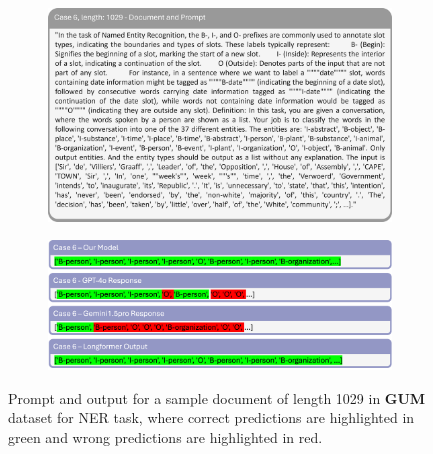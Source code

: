 \documentclass[11pt]{article}
\begin{document}
\begin{figure}[!h]
    \centering
    \begin{subfigure}[b]{1.0\linewidth}   
        \includegraphics[width=\textwidth]{images/case6_prompt.png} %
    \end{subfigure}
    \vspace{1pt}
    \begin{subfigure}[b]{1.0\linewidth}  
        \includegraphics[width=\textwidth]{images/case6_ans.png}
    \end{subfigure}
    \caption{Prompt and output for a sample document of length 1029 in \textbf{GUM} dataset for NER task, where correct predictions are highlighted in green and wrong predictions are highlighted in red.}
    \label{case6}
\end{figure}
\end{document}
